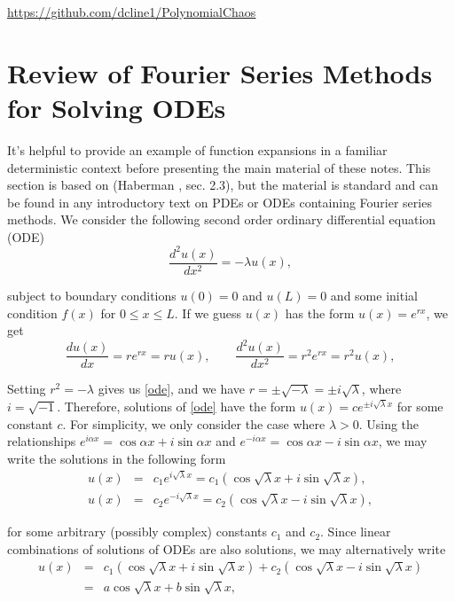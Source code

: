 \documentclass[11pt]{article}
\numberwithin{equation}{section}
\begin{document}
\begin{center}
\href{https://github.com/dcline1/PolynomialChaos/}{https://github.com/dcline1/PolynomialChaos}
\end{center}









\section{Review of Fourier Series Methods for Solving ODEs}

It's helpful to provide an example of function expansions in a familiar deterministic context before presenting the main material of these notes. This section is based on (Haberman \cite{H03}, sec. 2.3), but the material is standard and can be found in any introductory text on PDEs or ODEs containing Fourier series methods. We consider the following second order ordinary differential equation (ODE)
\begin{equation}
\frac{d^2 u(x)}{dx^2} = -\lambda u(x), \label{ode}
\end{equation}

subject to boundary conditions $u(0) = 0$ and $u(L) = 0$ and some initial condition $f(x)$ for $0 \leq x \leq L$. If we guess $u(x)$ has the form $u(x) = e^{rx}$, we get
\begin{equation*}
\frac{du(x)}{dx} = r e^{rx} = r u(x), \qquad \frac{d^2 u(x)}{dx^2} = r^2 e^{rx} = r^2 u(x),
\end{equation*}

Setting $r^2 = -\lambda$ gives us \eqref{ode}, and we have $r = \pm \sqrt{-\lambda} = \pm i \sqrt{\lambda}$, where $i = \sqrt{-1}$. Therefore, solutions of \eqref{ode} have the form $u(x) = c e^{\pm i \sqrt{\lambda} x}$ for some constant $c$. For simplicity, we only consider the case where $\lambda > 0$. Using the relationships $e^{i \alpha x} = \cos \alpha x + i \sin \alpha x$ and $e^{-i \alpha x} = \cos \alpha x - i \sin \alpha x$, we may write the solutions in the following form
\begin{eqnarray*}
u(x) & = & c_1 e^{i \sqrt{\lambda} x} = c_1 ( \cos \sqrt{\lambda} x + i \sin \sqrt{\lambda} x ), \\
u(x) & = & c_2 e^{-i \sqrt{\lambda} x} = c_2 ( \cos \sqrt{\lambda} x - i \sin \sqrt{\lambda} x ), 
\end{eqnarray*}

for some arbitrary (possibly complex) constants $c_1$ and $c_2$. Since linear combinations of solutions of ODEs are also solutions, we may alternatively write
\begin{eqnarray}
u(x) & = & c_1 ( \cos \sqrt{\lambda} x + i \sin \sqrt{\lambda} x ) +c_2 ( \cos \sqrt{\lambda} x - i \sin \sqrt{\lambda} x )  \nonumber \\
& = & a \cos \sqrt{\lambda} x + b \sin \sqrt{\lambda} x, \label{sol}
\end{eqnarray}
\end{document}
